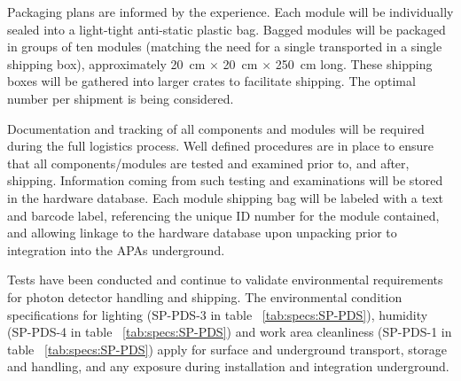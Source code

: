 Packaging plans are informed by the  experience.  Each  module will be individually sealed into a light-tight anti-static plastic bag.  Bagged modules will be packaged in groups of ten modules (matching the need for a single  transported in a single shipping box), approximately \SI{20}{cm} $\times$ \SI{20}{cm} $\times$ \SI{250}{cm} long.  These shipping boxes will be gathered into larger crates to facilitate shipping.  The optimal number per shipment is being considered.

Documentation and tracking of all components and  modules will be required during the full logistics process. Well defined procedures are in place to ensure that all components/modules are tested and examined prior to, and after, shipping. Information coming from such testing and examinations will be stored in the  hardware database.  Each  module shipping bag will be labeled with a text and barcode label, referencing the unique ID number for the module contained, and allowing linkage to the hardware database upon unpacking prior to integration into the APAs underground.

Tests have been conducted and continue to validate environmental requirements for photon detector handling and shipping. The environmental condition specifications for lighting (SP-PDS-3 in table ~\ref{tab:specs:SP-PDS}), humidity (SP-PDS-4 in table ~\ref{tab:specs:SP-PDS}) and work area cleanliness (SP-PDS-1 in table ~\ref{tab:specs:SP-PDS})
apply for surface and underground transport, storage and handling, and any exposure during installation and integration underground. 





